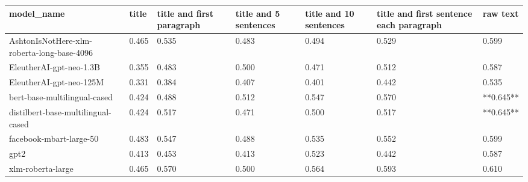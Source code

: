 \begin{tabular}{lllllll}
\toprule
                                model\_name & title & title and first paragraph & title and 5 sentences & title and 10 sentences & title and first sentence each paragraph &  raw text \\
\midrule
AshtonIsNotHere-xlm-roberta-long-base-4096 & 0.465 &                     0.535 &                 0.483 &                  0.494 &                                   0.529 &     0.599 \\
                   EleutherAI-gpt-neo-1.3B & 0.355 &                     0.483 &                 0.500 &                  0.471 &                                   0.512 &     0.587 \\
                   EleutherAI-gpt-neo-125M & 0.331 &                     0.384 &                 0.407 &                  0.401 &                                   0.442 &     0.535 \\
              bert-base-multilingual-cased & 0.424 &                     0.488 &                 0.512 &                  0.547 &                                   0.570 & **0.645** \\
        distilbert-base-multilingual-cased & 0.424 &                     0.517 &                 0.471 &                  0.500 &                                   0.517 & **0.645** \\
                   facebook-mbart-large-50 & 0.483 &                     0.547 &                 0.488 &                  0.535 &                                   0.552 &     0.599 \\
                                      gpt2 & 0.413 &                     0.453 &                 0.413 &                  0.523 &                                   0.442 &     0.587 \\
                         xlm-roberta-large & 0.465 &                     0.570 &                 0.500 &                  0.564 &                                   0.593 &     0.610 \\
\bottomrule
\end{tabular}
